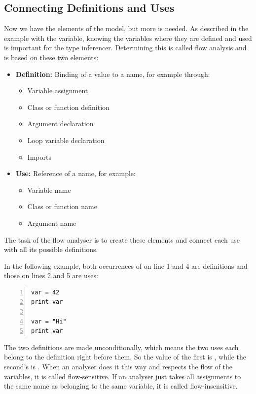 \documentclass[12pt,halfparskip,DIV11,BCOR10mm]{scrreprt}
\begin{document}
\subsection{Connecting Definitions and Uses}


Now we have the elements of the model, but more is needed. As described in the example with the  variable, knowing the variables where they are defined and used is important for the type inferencer. Determining this is called flow analysis and is based on these two elements:

\begin{itemize}
	\item \textbf{Definition:} Binding of a value to a name, for example through:
	\begin{itemize}
		\item Variable assignment
		\item Class or function definition
		\item Argument declaration
		\item Loop variable declaration
		\item Imports
	\end{itemize}
	\item \textbf{Use:} Reference of a name, for example:
	\begin{itemize}
		\item Variable name
		\item Class or function name
		\item Argument name
	\end{itemize}
\end{itemize}

The task of the flow analyser is to create these elements and connect each use with all its possible definitions.

In the following example, both occurrences of  on line 1 and 4 are definitions and those on lines 2 and 5 are uses:

\begin{lstlisting}[numbers=left]
var = 42
print var

var = "Hi"
print var
\end{lstlisting}

The two definitions are made unconditionally, which means the two uses each belong to the definition right before them. So the value of the first  is , while the second's is . When an analyser does it this way and respects the flow of the variables, it is called flow-sensitive. If an analyser just takes all assignments to the same name as belonging to the same variable, it is called flow-insensitive.
\end{document}
